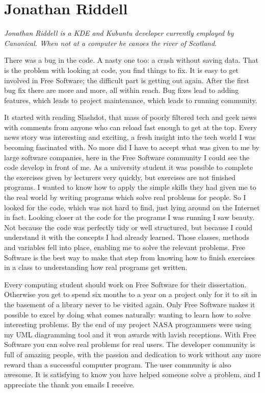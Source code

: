 \chapter{Jonathan Riddell}

\textit{Jonathan Riddell is a KDE and Kubuntu developer currently employed by
Canonical. When not at a computer he canoes the river of Scotland.}

There was a bug in the code. A nasty one too: a crash without saving data. That
is the problem with looking at code, you find things to fix. It is easy to get
involved in Free Software; the difficult part is getting out again. After the
first bug fix there are more and more, all within reach. Bug fixes lead to
adding features, which leads to project maintenance, which leads to running
community. 

It started with reading Slashdot, that mass of poorly filtered tech and geek
news with comments from anyone who can reload fast enough to get at the top.
Every news story was interesting and exciting, a fresh insight into the tech
world I was becoming fascinated with. No more did I have to accept what was
given to me by large software companies, here in the Free Software community I
could see the code develop in front of me.
As a university student it was possible to complete the exercises given by
lecturers very quickly, but exercises are not finished programs. I wanted to
know how to apply the simple skills they had given me to the real world by
writing programs which solve real problems for people. So I looked for the code,
which was not hard to find, just lying around on the Internet in fact. 
Looking closer at the code for the programs I was running I saw beauty. Not
because the code was perfectly tidy or well structured, but because I could
understand it with the concepts I had already learned. Those classes, methods
and variables fell into place, enabling me to solve the relevant problems. Free
Software is the best way to make that step from knowing how to finish exercises
in a class to understanding how real programs get written.

Every computing student should work on Free Software for their dissertation.
Otherwise you get to spend six months to a year on a project only for it to sit
in the basement of a library never to be visited again. Only Free Software makes
it possible to excel by doing what comes naturally: wanting to learn how to
solve interesting problems. By the end of my project NASA programmers were using
my UML diagramming tool and it won awards with lavish receptions. With Free
Software you can solve real problems for real users.
The developer community is full of amazing people, with the passion and
dedication to work without any more reward than a successful computer program.
The user community is also awesome. It is satisfying to know you have helped
someone solve a problem, and I appreciate the thank you emails I receive.

